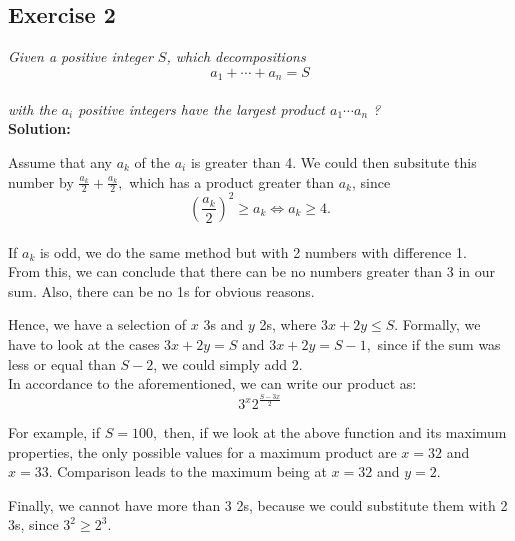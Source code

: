 \documentclass[12pt]{article}
\begin{document}
\subsection*{Exercise 2}
\textit{Given a positive integer $S$, which decompositions  \\
$$a_1+\cdots+a_n = S$$ \\
with the $a_i$ positive integers have the largest product $a_1 \cdots a_n$ ? }\\
\textbf{Solution:} \par
Assume that any $a_k$ of the $a_i$ is greater than 4. We could then subsitute this number by $\frac{a_k}{2} + \frac{a_k}{2},$ which has a product greater than $a_k$, since \\
 $$(\frac{a_k}{2})^2 \geqslant a_k \Leftrightarrow a_k \geqslant 4.$$ \\
 If $a_k$ is odd, we do the same method but with 2 numbers with difference 1. \\
 From this, we can conclude that there can be no numbers greater than 3 in our sum. Also, there can be no 1s for obvious reasons.  \par
 Hence, we have a selection of $x$ 3s and $y$ 2s, where $3x+2y \leqslant S.$ Formally, we have to look at the cases $3x + 2y = S$ and $3x+2y = S-1,$ since if the sum was less or equal than $S-2$, we could simply add 2. \\
 In accordance to the aforementioned, we can write our product as: \\
 $$3^x2^{\frac{S-3x}{2}}$$\par
 For example, if $ S = 100,$ then, if we look at the above function and its maximum properties, the only possible values for a maximum product are $x = 32$ and  $x = 33$. Comparison leads to the maximum being at $x = 32$ and $y = 2$. \par
 Finally, we cannot have more than 3 2s, because we could substitute them with 2 3s, since $3^2 \geqslant 2^3$.
\newpage

\end{document}
